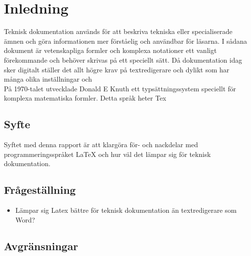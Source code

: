 \section{Inledning}
Teknisk dokumentation används för att beskriva tekniska eller specialiserade ämnen och göra informationen mer förståelig och användbar för läsarna. I sådana dokument är vetenskapliga formler och komplexa notationer ett vanligt förekommande och behöver skrivas på ett speciellt sätt. Då dokumentation idag sker digitalt ställer det allt högre krav på textredigerare och dylikt som har många olika inställningar och
\\
På 1970-talet utvecklade Donald E Knuth ett typsättningssystem speciellt för komplexa matematiska formler. Detta språk heter Tex


\subsection{Syfte}
Syftet med denna rapport är att klargöra för- och nackdelar med programmeringsspråket {\LaTeX} och hur väl det lämpar sig för teknisk dokumentation.  

\subsection{Frågeställning}
\begin{itemize} 
\item Lämpar sig Latex bättre för teknisk dokumentation än textredigerare som Word?
\end{itemize}
		
\subsection{Avgränsningar}


	